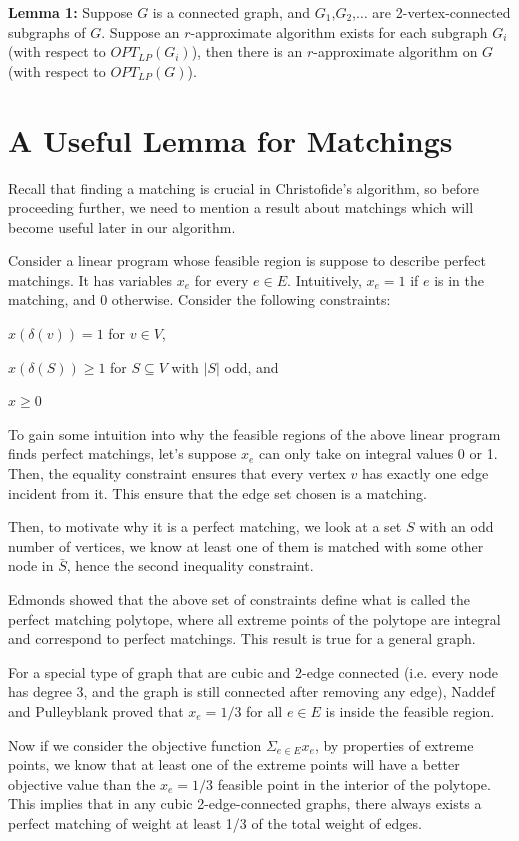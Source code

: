 \documentclass[12pt]{article}
\begin{document}
{\bf Lemma 1:} Suppose $G$ is a connected graph, and $G_1$,$G_2$,$\ldots$ are 2-vertex-connected subgraphs of $G$. Suppose an $r$-approximate algorithm exists for each subgraph $G_i$ (with respect to $OPT_{LP}(G_i)$), then there is an $r$-approximate algorithm on $G$ (with respect to $OPT_{LP}(G)$).

\section{A Useful Lemma for Matchings}

Recall that finding a matching is crucial in Christofide's algorithm, so before proceeding further, we need to mention a result about matchings which will become useful later in our algorithm.

Consider a linear program whose feasible region is suppose to describe perfect matchings. It has variables $x_e$ for every $e \in E$. Intuitively, $x_e = 1$ if $e$ is in the matching, and 0 otherwise. Consider the following constraints:

$x(\delta(v)) = 1$ for $v \in V$,

$x(\delta(S))\geq 1$ for $S \subseteq V$ with $|S|$ odd, and

$x \geq 0$

To gain some intuition into why the feasible regions of the above linear program finds perfect matchings, let's suppose $x_e$ can only take on integral values 0 or 1. Then, the equality constraint ensures that every vertex $v$ has exactly one edge incident from it. This ensure that the edge set chosen is a matching.

Then, to motivate why it is a perfect matching, we look at a set $S$ with an odd number of vertices, we know at least one of them is matched with some other node in $\bar{S}$, hence the second inequality constraint.

Edmonds showed that the above set of constraints define what is called the perfect matching polytope, where all extreme points of the polytope are integral and correspond to perfect matchings. This result is true for a general graph.

For a special type of graph that are cubic and 2-edge connected (i.e. every node has degree 3, and the graph is still connected after removing any edge), Naddef and Pulleyblank proved that $x_e = 1/3$ for all $e \in E$ is inside the feasible region.

Now if we consider the objective function $\Sigma_{e\in E}x_e$, by properties of extreme points, we know that at least one of the extreme points will have a better objective value than the $x_e = 1/3$ feasible point in the interior of the polytope. This implies that in any cubic 2-edge-connected graphs, there always exists a perfect matching of weight at least 1/3 of the total weight of edges.
\end{document}
